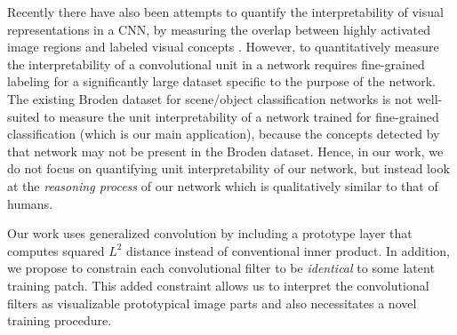 \documentclass{article}
\theoremstyle{definition}
\theoremstyle{remark}
\begin{document}
Recently there have also been attempts to quantify the interpretability of visual representations in a CNN, by measuring the overlap between highly activated image regions and labeled visual concepts \cite{bau2017network,zhang2017interpretable}.
However, to quantitatively measure the interpretability of a convolutional unit in a network requires fine-grained labeling for a significantly large dataset specific to the purpose of the network.
The existing Broden dataset for scene/object classification networks \cite{bau2017network} is not well-suited to measure the unit interpretability of a network trained for fine-grained classification (which is our main application), because the concepts detected by that network may not be present in the Broden dataset. Hence, in our work, we do not focus on quantifying unit interpretability of our network, but instead look at the \textit{reasoning process} of our network which is qualitatively similar to that of humans. %


Our work uses generalized convolution \cite{ghiasi2017generalizing,nalaie2017efficient} by including a prototype layer that computes squared $L^2$ distance instead of conventional inner product. In addition, we propose to constrain each convolutional filter to be \textit{identical} to some latent training patch. This added constraint allows us to interpret the convolutional filters as visualizable prototypical image parts and also necessitates a novel training procedure.
\end{document}
